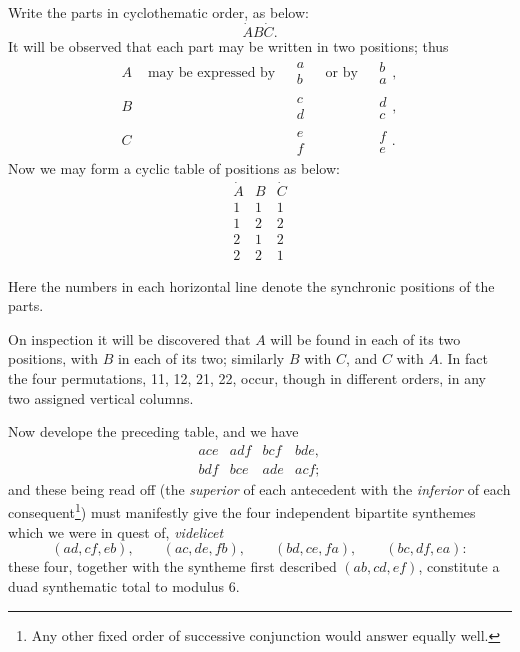 \documentclass[11pt]{article}
\newcommand{\sourcepage}[1]{\marginpar{\scriptsize p.~#1}}
\newcommand{\dotter}[1]{\dot{#1}}
\begin{document}
Write the parts in cyclothematic order, as below:
\[
\dotter A B\dotter C.
\]
It will be observed that each part may be written in two positions; thus
\[
\begin{array}{rclcccl}
A&\text{ may be expressed by }&\begin{matrix}a\\ b\end{matrix}&\text{ or by }&\begin{matrix}b\\ a\end{matrix},\\[0.7em]
B&&\begin{matrix}c\\ d\end{matrix}&&\begin{matrix}d\\ c\end{matrix},\\[0.7em]
C&&\begin{matrix}e\\ f\end{matrix}&&\begin{matrix}f\\ e\end{matrix}.
\end{array}
\]
Now we may form a cyclic table of positions as below:
\[
\begin{array}{ccc}
\dotter A& B& \dotter C\\ \hline
1&1&1\\
1&2&2\\
2&1&2\\
2&2&1
\end{array}
\]

\sourcepage{95}
Here the numbers in each horizontal line denote the synchronic positions of the parts.

On inspection it will be discovered that $A$ will be found in each of its two positions, with $B$ in each of its two; similarly $B$ with $C$, and $C$ with $A$. In fact the four permutations, 11, 12, 21, 22, occur, though in different orders, in any two assigned vertical columns.

Now develope the preceding table, and we have
\[
\begin{array}{llll}
ace&adf&bcf&bde,\\
bdf&bce&ade&acf;
\end{array}
\]
and these being read off (the \emph{superior} of each antecedent with the \emph{inferior} of each consequent\footnote{Any other fixed order of successive conjunction would answer equally well.}) must manifestly give the four independent bipartite synthemes which we were in quest of, \emph{videlicet}
\[
(ad,cf,eb),\qquad (ac,de,fb),\qquad (bd,ce,fa),\qquad (bc,df,ea):
\]
these four, together with the syntheme first described $(ab,cd,ef)$, constitute a duad synthematic total to modulus 6.
\end{document}
